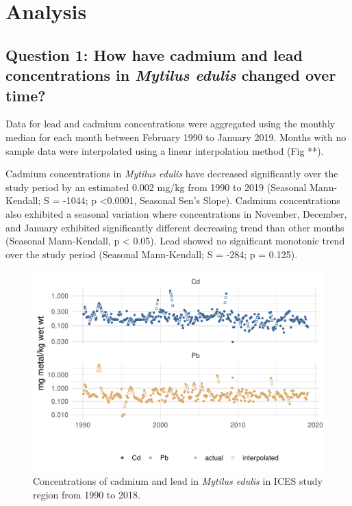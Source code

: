 \documentclass[
  12pt,
]{article}
\begin{document}
\newpage

\hypertarget{analysis}{%
\section{Analysis}\label{analysis}}

\hypertarget{question-1-how-have-cadmium-and-lead-concentrations-in-mytilus-edulis-changed-over-time}{%
\subsection{\texorpdfstring{Question 1: How have cadmium and lead
concentrations in \emph{Mytilus edulis} changed over
time?}{Question 1: How have cadmium and lead concentrations in Mytilus edulis changed over time?}}\label{question-1-how-have-cadmium-and-lead-concentrations-in-mytilus-edulis-changed-over-time}}

Data for lead and cadmium concentrations were aggregated using the
monthly median for each month between February 1990 to January 2019.
Months with no sample data were interpolated using a linear
interpolation method (Fig **).

Cadmium concentrations in \emph{Mytilus edulis} have decreased
significantly over the study period by an estimated 0.002 mg/kg from
1990 to 2019 (Seasonal Mann-Kendall; S = -1044; p \textless0.0001,
Seasonal Sen's Slope). Cadmium concentrations also exhibited a seasonal
variation where concentrations in November, December, and January
exhibited significantly different decreasing trend than other months
(Seasonal Mann-Kendall, p \textless{} 0.05). Lead showed no significant
monotonic trend over the study period (Seasonal Mann-Kendall; S = -284;
p = 0.125).

\begin{figure}
\centering
\includegraphics{McCrory_ENV972_Project_files/figure-latex/unnamed-chunk-7-1.pdf}
\caption{Concentrations of cadmium and lead in \emph{Mytilus edulis} in
ICES study region from 1990 to 2018.}
\end{figure}
\end{document}
